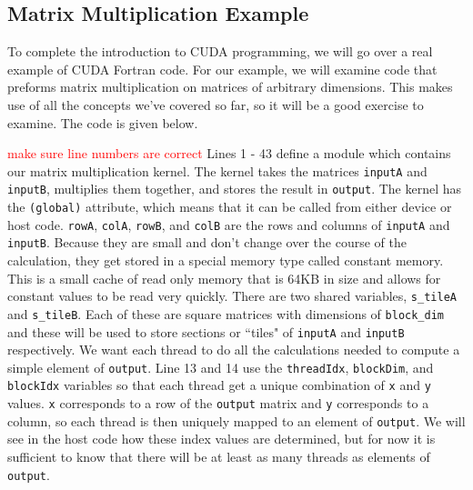 \documentclass[12pt]{report}
\newcommand{\notetodylan}[1]{\textcolor{red}{#1}} %
\begin{document}
\subsection{Matrix Multiplication Example}
To complete the introduction to CUDA programming, we will go over a real example of CUDA Fortran code. For our example, we will examine code that preforms matrix multiplication on matrices of arbitrary dimensions. This makes use of all the concepts we've covered so far, so it will be a good exercise to examine. The code is given below.


\notetodylan{make sure line numbers are correct} Lines 1 - 43 define a module which contains our matrix multiplication kernel. The kernel takes the matrices \texttt{inputA} and \texttt{inputB}, multiplies them together, and stores the result in \texttt{output}. The kernel has the \texttt{{\color{myblue}{attributes}}(global)} attribute, which means that it can be called from either device or host code. \texttt{rowA}, \texttt{colA}, \texttt{rowB}, and \texttt{colB} are the rows and columns of \texttt{inputA} and \texttt{inputB}. Because they are small and don't change over the course of the calculation, they get stored in a special memory type called constant memory. This is a small cache of read only memory that is 64KB in size and allows for constant values to be read very quickly. There are two shared variables, \texttt{s\_tileA} and \texttt{s\_tileB}. Each of these are square matrices with dimensions of \texttt{block\_dim} and these will be used to store sections or ``tiles" of \texttt{inputA} and \texttt{inputB} respectively. We want each thread to do all the calculations needed to compute a simple element of \texttt{output}. Line 13 and 14 use the \texttt{threadIdx}, \texttt{blockDim}, and \texttt{blockIdx} variables so that each thread get a unique combination of \texttt{x} and \texttt{y} values. \texttt{x} corresponds to a row of the \texttt{output} matrix and \texttt{y} corresponds to a column, so each thread is then uniquely mapped to an element of \texttt{output}. We will see in the host code how these index values are determined, but for now it is sufficient to know that there will be at least as many threads as elements of \texttt{output}.
\end{document}
